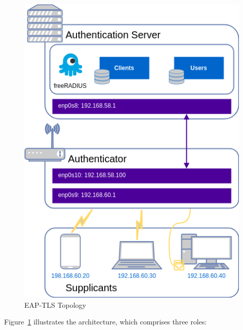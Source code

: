 \begin{figure}
    \centering
    \includegraphics[width=0.5\linewidth]{figs/topology-EAP.png}
    \caption{\ac{EAP-TLS} Topology}
    \label{fig:EAP-TLS-topology}
\end{figure}

Figure~\ref{fig:EAP-TLS-topology} illustrates the architecture, which comprises three roles:

